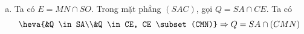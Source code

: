 \begin{bt}
{\begin{enumerate}[a)]
\begin{center}
\begin{tikzpicture}[scale=1, font=\scriptsize,>=stealth]
		\end{tikzpicture}
	\end{center}
		Ta có $SD \subset (SBD)$. Xét $(SBD)$ và $(AMN)$, có
		\begin{itemize}
			\item $M$ là điểm chung thứ nhất.
			\item Gọi $T=AC \cap BD$, $K=AF \cap ST$ thì $K$ là điểm chung thứ hai.
		\end{itemize}
		Suy ra $MK=(SBD) \cap (AMN)$. Trong $(SBD)$, gọi $G=SD \cap MK$. Ta có
		$$\heva{& G \in SD \\ & G \in MK,\, MK \subset \left(AMN\right)}\Rightarrow G=SD\cap \left(AMN\right)$$
			\item Ta có $E=MN \cap SO$. Trong mặt phẳng $(SAC)$, gọi $Q=SA \cap CE$. Ta có
			$$\heva{&Q \in SA\\&Q \in CE, CE \subset (CMN)} \Rightarrow Q=SA \cap (CMN)$$
		\end{enumerate}
	}
\end{bt}

